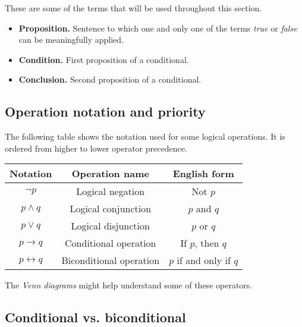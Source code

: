 \documentclass{article}
\begin{document}
These are some of the terms that will be used throughout this section.

\begin{itemize}
  \item \textbf{Proposition.} Sentence to which one and only one of the terms
    \textit{true} or \textit{false} can be meaningfully applied.
  \item \textbf{Condition.} First proposition of a conditional.
  \item \textbf{Conclusion.} Second proposition of a conditional.
\end{itemize}

\subsection{Operation notation and priority}

The following table shows the notation used for some logical operations. It is
ordered from higher to lower operator precedence.

\bigskip
\begin{center}
  \begin{tabular}{| c | c | c |}
    \hline
    Notation & Operation name & English form \\
    \hline
    $\neg p$              & Logical negation        & Not $p$ \\
    $p \land q$           & Logical conjunction     & $p$ and $q$ \\
    $p \lor q$            & Logical disjunction     & $p$ or $q$ \\
    $p \to q$             & Conditional operation   & If $p$, then $q$ \\
    $p \leftrightarrow q$ & Biconditional operation & $p$ if and only if $q$ \\
    \hline
  \end{tabular}
\end{center}
\bigskip

The \textit{Venn diagrams} might help understand some of these operators.

\subsection{Conditional vs. biconditional}
\end{document}
